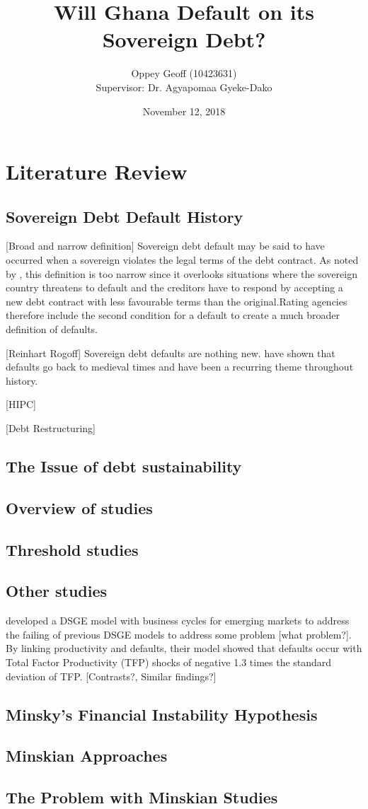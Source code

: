 \documentclass[14pt, a4paper]{article}
\title{Will Ghana Default on its Sovereign Debt?}
\author{Oppey Geoff (10423631) \\ Supervisor: Dr. Agyapomaa Gyeke-Dako}
\date{November 12, 2018}
\begin{document}
	\maketitle
	\clearpage
	\doublespacing	
	\section{Literature Review}
	\subsection{Sovereign Debt Default History}
	[Broad and narrow definition] 
	Sovereign debt default may be said to have occurred when a sovereign violates the legal terms of the debt contract. As noted by , this definition is too narrow since it overlooks situations where the sovereign country threatens to default and the creditors have to respond by accepting a new debt contract with less favourable terms than the original.Rating agencies therefore include the second condition for a default to create a much broader definition of defaults. \cite{beers2007default}
	
	
	[Reinhart Rogoff] Sovereign debt defaults are nothing new.  have shown that defaults go back to medieval times and have been a recurring theme throughout history.
	
	[HIPC]
	
	
	[Debt Restructuring]
	
	\subsection{The Issue of debt sustainability}
	\subsection{Overview of studies}
	\subsection{Threshold studies}
	\subsection{Other studies}
	\cite{mendoza2012general} developed a DSGE model with business cycles for emerging markets to address the failing of previous DSGE models to address some problem [what problem?]. By linking productivity and defaults, their model showed that defaults occur with Total Factor Productivity (TFP) shocks of negative 1.3 times the standard deviation of TFP. [Contrasts?, Similar findings?]
	\subsection{Minsky's Financial Instability Hypothesis}
	\subsection{Minskian Approaches}
	\subsection{The Problem with Minskian Studies}
	\newpage
	\singlespacing
		
	
\end{document}

